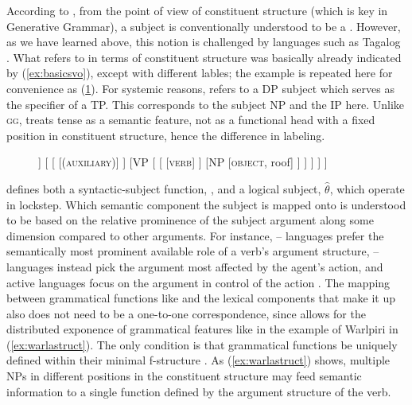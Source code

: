 According to \citep{carnie2013}, from the point of view of constituent
structure (which is key in Generative Grammar), a subject is conventionally
understood to be a . However, as
we have learned above, this notion is challenged by languages such as Tagalog
\citep[225]{kroeger1991}. What \citet{carnie2013} refers to in terms of
constituent structure was basically already indicated by (\ref{ex:basicsvo}),
except with different lables; the example is repeated here for convenience as
(\ref{ex:basicsvo2}). For systemic reasons, \citet{carnie2013} refers to a DP
subject which serves as the specifier of a TP. This corresponds to the subject
NP and the IP here. Unlike \textsc{gg}, \Lfg{} treats tense as a semantic
feature, not as a functional head with a fixed position in constituent
structure, hence the difference in labeling.

\begin{figure}[htp]
\ex\label{ex:basicsvo2}
\begin{forest}
[IP
	[NP
		[\textsc{subject}, roof]
	]
	[
		[
			[\textsc{(auxiliary)}]
		]
		[VP
			[
				[
					[\textsc{verb}]
				]
				[NP
					[\textsc{object}, roof]
				]
			]
		]
	]
]
\end{forest}
\xe
\end{figure}

\Lfg{} defines both a syntactic-subject function, \Subj{}, and a logical
subject, $\hat{\theta}$, which operate in lockstep. Which semantic component
the subject is mapped onto is understood to be based on the relative prominence
of the subject argument along some dimension compared to other arguments. For
instance, \Nom{}--\Acc{} languages prefer the semantically most
prominent available role of a verb's argument structure, \Abs{}--\Erg{}
languages instead pick the argument most affected by the agent's action, and
active languages focus on the argument in control of the action
\citep[95--96]{bresnan2016}. The mapping between grammatical functions like
\Subj{} and the lexical components that make it up also does not need to be a
one-to-one correspondence, since \Lfg{} allows for the distributed exponence of
grammatical features like in the example of Warlpiri in (\ref{ex:warlastruct}).
The only condition is that grammatical functions be uniquely defined within
their minimal f-structure \citep[45]{bresnan2016}. As (\ref{ex:warlastruct})
shows, multiple NPs in different positions in the constituent structure may
feed semantic information to a single function defined by the argument
structure of the verb.

